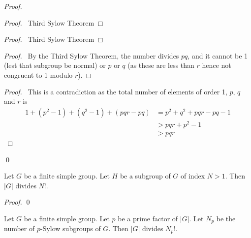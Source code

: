 \begin{proof}
\pf
{}
\begin{proof}
	\pf\ Third Sylow Theorem
\end{proof}
\begin{proof}
	\pf\ Third Sylow Theorem
\end{proof}
\begin{proof}
	\pf\ By the Third Sylow Theorem, the number divides $pq$, and it cannot be 1 (lest that subgroup be normal) or $p$ or $q$ (as these are less than $r$ hence not congruent to 1 modulo $r$).
\end{proof}
\qedstep
\begin{proof}
	\pf\ This is a contradiction as the total number of elements of order 1, $p$, $q$ and $r$ is
	\begin{align*}
		1 + (p^2 - 1) + (q^2 - 1) + (pqr - pq)
		& = p^2 + q^2 + pqr - pq - 1 \\
		& > pqr + p^2 - 1 \\
		& > pqr
	\end{align*}
\end{proof}
\qed
\end{proof}

\begin{prop}
Let $G$ be a finite simple group. Let $H$ be a subgroup of $G$ of index $N > 1$. Then $|G|$ divides $N!$.
\end{prop}

\begin{proof}
\pf
{}
\qed
\end{proof}

\begin{cor}
Let $G$ be a finite simple group. Let $p$ be a prime factor of $|G|$.
Let $N_p$ be the number of $p$-Sylow subgroups of $G$. Then $|G|$ divides $N_p!$.
\end{cor}

